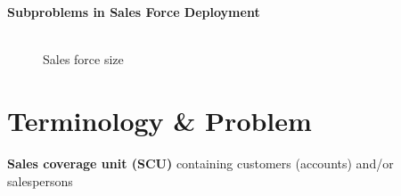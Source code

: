 \begin{frame}{\textbf{Subproblems in Sales Force Deployment}}
\begin{figure}
 \begin{minipage}[b]{0.45\linewidth} \centering
  \\
	Sales force size 
 \end{minipage}
	\vspace{0.5cm}
\end{figure}
\end{frame}



\section{Terminology \& Problem}

\begin{frame}{\textbf{Sales coverage unit (SCU)}}
containing customers (accounts) and/or salespersons \\
\centering

\end{frame}

